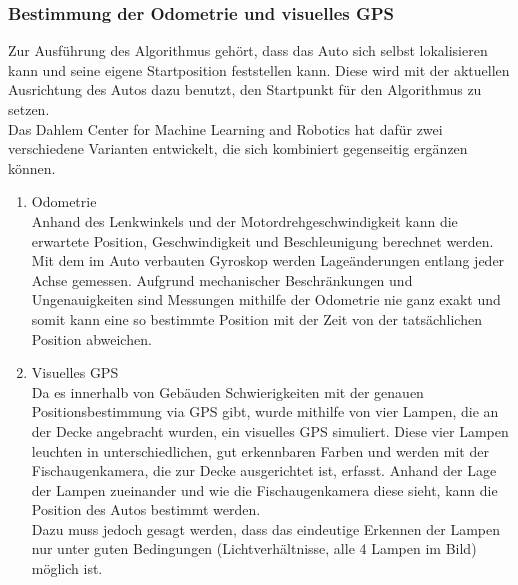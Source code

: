 \subsubsection{Bestimmung der Odometrie und visuelles GPS}
Zur Ausführung des Algorithmus gehört, dass das Auto sich selbst lokalisieren kann und seine eigene Startposition feststellen kann. Diese wird mit der aktuellen Ausrichtung des Autos dazu benutzt, den Startpunkt für den Algorithmus zu setzen. \\
Das Dahlem Center for Machine Learning and Robotics hat dafür zwei verschiedene Varianten entwickelt, die sich kombiniert gegenseitig ergänzen können. \\
\begin{enumerate}
\item Odometrie \\
Anhand des Lenkwinkels und der Motordrehgeschwindigkeit kann die erwartete Position, Geschwindigkeit und Beschleunigung berechnet werden. Mit dem im Auto verbauten Gyroskop werden Lageänderungen entlang jeder Achse gemessen. Aufgrund mechanischer Beschränkungen und Ungenauigkeiten sind Messungen mithilfe der Odometrie nie ganz exakt und somit kann eine so bestimmte Position mit der Zeit von der tatsächlichen Position abweichen.
\item Visuelles GPS\\
Da es innerhalb von Gebäuden Schwierigkeiten mit der genauen Positionsbestimmung via GPS gibt, wurde mithilfe von vier Lampen, die an der Decke angebracht wurden, ein visuelles GPS simuliert. Diese vier Lampen leuchten in unterschiedlichen, gut erkennbaren Farben und werden mit der Fischaugenkamera, die zur Decke ausgerichtet ist, erfasst. Anhand der Lage der Lampen zueinander und wie die Fischaugenkamera diese sieht, kann die Position des Autos bestimmt werden.\\
Dazu muss jedoch gesagt werden, dass das eindeutige Erkennen der Lampen nur unter guten Bedingungen (Lichtverhältnisse, alle 4 Lampen im Bild) möglich ist. 
\end{enumerate}

